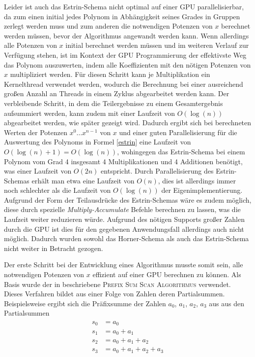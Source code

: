 Leider ist auch das Estrin-Schema nicht optimal auf einer GPU parallelisierbar, da zum einen initial jedes Polynom in Abhängigkeit seines Grades in Gruppen zerlegt werden muss und zum anderen die notwendigen Potenzen von $x$ berechnet werden müssen, bevor der Algorithmus angewandt werden kann. Wenn allerdings alle Potenzen von $x$ initial berechnet werden müssen und im weiteren Verlauf zur Verfügung stehen, ist im Kontext der GPU Programmierung der effektivste Weg das Polynom auszuwerten, indem alle Koeffizienten mit den nötigen Potenzen von $x$ multipliziert werden. Für diesen Schritt kann je Multiplikation ein Kernelthread verwendet werden, wodurch die Berechnung bei einer ausreichend großen Anzahl an Threads in einem Zyklus abgearbeitet werden kann. 
Der verbleibende Schritt, in dem die Teilergebnisse zu einem Gesamtergebnis aufsummiert werden, kann zudem mit einer Laufzeit von $O(\log(n))$ abgearbeitet werden, wie später gezeigt wird.
Dadurch ergibt sich bei berechneten Werten der Potenzen $x^0 \dots x^{n-1}$ von $x$ und einer guten Parallelisierung für die Auswertung des Polynoms in Formel \eqref{estrin} eine Laufzeit von $O(\log(n)+1) = O(\log(n))$, wohingegen das Estrin-Schema bei einem Polynom vom Grad 4 insgesamt 4 Multiplikationen und 4 Additionen benötigt, was einer Laufzeit von $O(2n)$ entspricht. Durch Parallelisierung des Estrin-Schemas erhält man etwa eine Laufzeit von $O(n)$, dies ist allerdings immer noch schlechter als die Laufzeit von $O(\log(n))$ der Eigenimplementierung. Aufgrund der Form der Teilausdrücke des Estrin-Schemas wäre es zudem möglich, diese durch spezielle \textit{Multiply-Accumulate} Befehle berechnen zu lassen, was die Laufzeit weiter reduzieren würde. Aufgrund des nötigen Supports großer Zahlen durch die GPU ist dies für den gegebenen Anwendungsfall allerdings auch nicht möglich. Dadurch wurden sowohl das Horner-Schema als auch das Estrin-Schema nicht weiter in Betracht gezogen.\par

Der erste Schritt bei der Entwicklung eines Algorithmus musste somit sein, alle notwendigen Potenzen von $x$ effizient auf einer GPU berechnen zu können. Als Basis wurde der in \cite{Harris:2014} beschriebene \textsc{Prefix Sum Scan Algorithmus} verwendet. Dieses Verfahren bildet aus einer Folge von Zahlen deren Partialsummen. Beispielsweise ergibt sich die Präfixsumme der Zahlen $a_0$, $a_1$, $a_2$, $a_3$ aus aus den Partialsummen
\begin{align}\label{prefix_sum}
\begin{split}
s_0 &= a_0 \\
s_1 &= a_0 + a_1 \\
s_2 &= a_0 + a_1 + a_2 \\
s_3 &= a_0 + a_1 + a_2 + a_3
\end{split}
\end{align}

